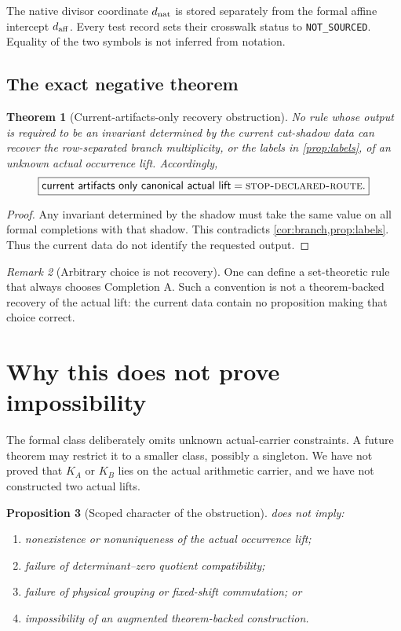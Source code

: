 \documentclass[11pt]{article}
\newtheorem{theorem}{Theorem}[section]
\newtheorem{proposition}[theorem]{Proposition}
\theoremstyle{definition}
\theoremstyle{remark}
\newtheorem{remark}[theorem]{Remark}
\newcommand{\STOP}{\textnormal{\textsc{stop-declared-route}}}
\begin{document}
The native divisor coordinate \(d_{\rm nat}\) is stored separately
from the formal affine intercept \(d_{\rm aff}\).  Every test record
sets their crosswalk status to \texttt{NOT\_SOURCED}.  Equality of
the two symbols is not inferred from notation.

\subsection{The exact negative theorem}

\begin{theorem}[Current-artifacts-only recovery obstruction]
\label{thm:obstruction}
No rule whose output is required to be an invariant determined by
the current cut-shadow data can recover the row-separated branch
multiplicity, or the labels in \cref{prop:labels}, of an unknown
actual occurrence lift.  Accordingly,
\[
 \boxed{
 \mathsf{current\ artifacts\ only\ canonical\ actual\ lift}
 =\STOP.}
\]
\end{theorem}

\begin{proof}
Any invariant determined by the shadow must take the same value on
all formal completions with that shadow.  This contradicts
\cref{cor:branch,prop:labels}.  Thus the current data do not identify
the requested output.
\end{proof}

\begin{remark}[Arbitrary choice is not recovery]
One can define a set-theoretic rule that always chooses Completion A.
Such a convention is not a theorem-backed recovery of the actual
lift: the current data contain no proposition making that choice
correct.
\end{remark}

\section{Why this does not prove impossibility}

The formal class deliberately omits unknown actual-carrier
constraints.  A future theorem may restrict it to a smaller class,
possibly a singleton.  We have not proved that \(K_A\) or \(K_B\)
lies on the actual arithmetic carrier, and we have not constructed
two actual lifts.

\begin{proposition}[Scoped character of the obstruction]
\label{prop:scope}
 does not imply:
\begin{enumerate}[label=(\alph*),leftmargin=2em]
\item nonexistence or nonuniqueness of the actual occurrence lift;
\item failure of determinant--zero quotient compatibility;
\item failure of physical grouping or fixed-shift commutation; or
\item impossibility of an augmented theorem-backed construction.
\end{enumerate}
\end{proposition}
\end{document}
